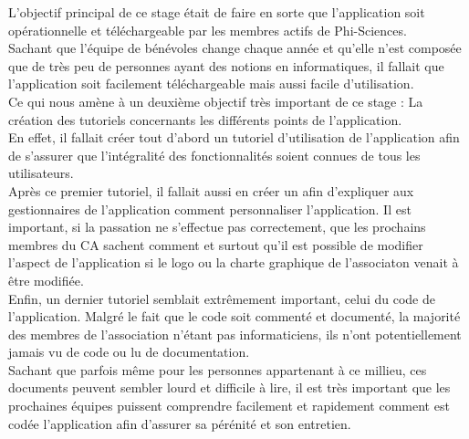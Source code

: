 \documentclass[11pt, twoside]{article}
\begin{document}
L'objectif principal de ce stage était de faire en sorte que l'application soit opérationnelle et téléchargeable par les membres actifs de Phi-Sciences.
\vspace*{0.2cm}\\
Sachant que l'équipe de bénévoles change chaque année et qu'elle n'est composée que de très peu de personnes ayant des notions en informatiques, il fallait que l'application soit facilement téléchargeable mais aussi facile d'utilisation.\\
Ce qui nous amène à un deuxième objectif très important de ce stage : La création des tutoriels concernants les différents points de l'application.
\vspace*{0.2cm}\\
En effet, il fallait créer tout d'abord un tutoriel d'utilisation de l'application afin de s'assurer que l'intégralité des fonctionnalités soient connues de tous les utilisateurs.\\
Après ce premier tutoriel, il fallait aussi en créer un afin d'expliquer aux gestionnaires de l'application comment personnaliser l'application.
Il est important, si la passation ne s'effectue pas correctement, que les prochains membres du CA sachent comment et surtout qu'il est possible de modifier l'aspect de l'application si le logo ou la charte graphique de l'associaton venait à être modifiée.
\vspace*{0.2cm}\\
Enfin, un dernier tutoriel semblait extrêmement important, celui du code de l'application. 
Malgré le fait que le code soit commenté et documenté, la majorité des membres de l'association n'étant pas informaticiens, ils n'ont potentiellement jamais vu de code ou lu de documentation.\\
Sachant que parfois même pour les personnes appartenant à ce millieu, ces documents peuvent sembler lourd et difficile à lire, il est très important que les prochaines équipes puissent comprendre facilement et rapidement comment est codée l'application afin d'assurer sa pérénité et son entretien.
\end{document}
